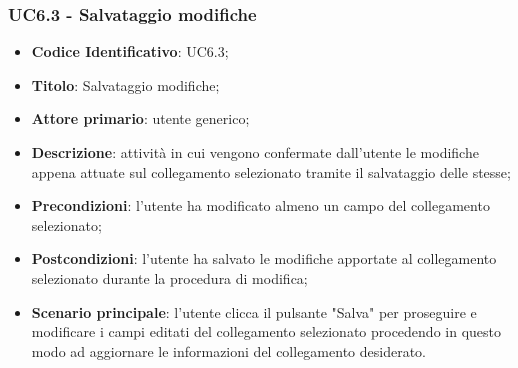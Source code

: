 	\subsubsection{UC6.3 - Salvataggio modifiche}
		\begin{itemize}
			\item\textbf{Codice Identificativo}: UC6.3;
			\item\textbf{Titolo}: Salvataggio modifiche;
			\item\textbf{Attore primario}: utente generico;
			\item\textbf{Descrizione}: attività in cui vengono confermate dall'utente le modifiche appena attuate sul collegamento selezionato tramite il salvataggio delle stesse;
			\item\textbf{Precondizioni}: l'utente ha modificato almeno un campo del collegamento selezionato;
			\item\textbf{Postcondizioni}: l'utente ha salvato le modifiche apportate al collegamento selezionato durante la procedura di modifica;	
			\item\textbf{Scenario principale}: l'utente clicca il pulsante "Salva" per proseguire e modificare i campi editati del collegamento selezionato procedendo in questo modo ad aggiornare le informazioni del collegamento desiderato.
			\end{itemize}
			
	\label{par:UC6.4}
